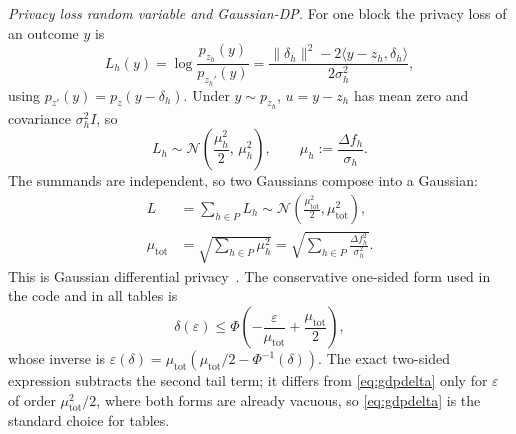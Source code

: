 \emph{Privacy loss random variable and Gaussian-DP.} For one block the privacy
loss of an outcome $y$ is
\begin{equation}
L_h(y)=\log\frac{p_{z_h}(y)}{p_{z_h'}(y)}
=\frac{\|\delta_h\|^{2}-2\langle y-z_h,\delta_h\rangle}{2\sigma_h^{2}},
\label{eq:loss}
\end{equation}
using $p_{z'}(y)=p_z(y-\delta_h)$. Under $y\sim p_{z_h}$,
$u=y-z_h$ has mean zero and covariance $\sigma_h^2I$, so
\begin{equation}
L_h\sim\mathcal{N}\!\left(\frac{\mu_h^{2}}{2},\,\mu_h^{2}\right),
\qquad \mu_h:=\frac{\Delta f_h}{\sigma_h}.
\label{eq:gdpblock}
\end{equation}
The summands are independent, so two Gaussians compose into a Gaussian:
\begin{equation}\begin{split}
L&=\sum_{h\in P}L_h
\sim\mathcal{N}\!\left(\frac{\mu_{\mathrm{tot}}^{2}}{2},
\mu_{\mathrm{tot}}^{2}\right),\\
\mu_{\mathrm{tot}}&=\sqrt{\sum_{h\in P}\mu_h^{2}}
=\sqrt{\sum_{h\in P}\frac{\Delta f_h^{2}}{\sigma_h^{2}}}.
\end{split}\label{eq:gdpsum}
\end{equation}
This is Gaussian differential privacy~\cite{dong2022gdp}. The conservative
one-sided form used in the code and in all tables is
\begin{equation}
\delta(\varepsilon)\le\Phi\!\left(-\frac{\varepsilon}{\mu_{\mathrm{tot}}}
+\frac{\mu_{\mathrm{tot}}}{2}\right),
\label{eq:gdpdelta}
\end{equation}
whose inverse is
$\varepsilon(\delta)=\mu_{\mathrm{tot}}(\mu_{\mathrm{tot}}/2-\Phi^{-1}(\delta))$.
The exact two-sided expression subtracts the second tail term; it differs
from \eqref{eq:gdpdelta} only for $\varepsilon$ of order
$\mu_{\mathrm{tot}}^2/2$, where both forms are already vacuous, so
\eqref{eq:gdpdelta} is the standard choice for tables.

